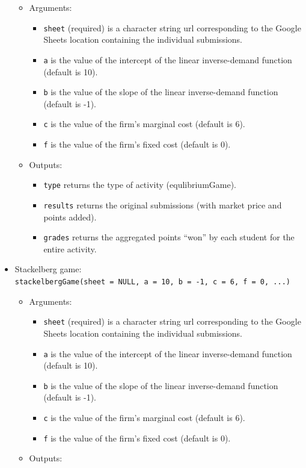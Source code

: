 \documentclass[
]{article}
\providecommand{\tightlist}{%
  \setlength{\itemsep}{0pt}\setlength{\parskip}{0pt}}
\begin{document}
\begin{itemize}
  \begin{itemize}
  \item
    Arguments:

    \begin{itemize}
    \tightlist
    \item
      \texttt{sheet} (required) is a character string url corresponding
      to the Google Sheets location containing the individual
      submissions.
    \item
      \texttt{a} is the value of the intercept of the linear
      inverse-demand function (default is 10).
    \item
      \texttt{b} is the value of the slope of the linear inverse-demand
      function (default is -1).
    \item
      \texttt{c} is the value of the firm's marginal cost (default is
      6).
    \item
      \texttt{f} is the value of the firm's fixed cost (default is 0).
    \end{itemize}
  \item
    Outputs:

    \begin{itemize}
    \tightlist
    \item
      \texttt{type} returns the type of activity (equlibriumGame).
    \item
      \texttt{results} returns the original submissions (with market
      price and points added).
    \item
      \texttt{grades} returns the aggregated points ``won'' by each
      student for the entire activity.
    \end{itemize}
  \end{itemize}
\item
  Stackelberg game:
  \texttt{stackelbergGame(sheet\ =\ NULL,\ a\ =\ 10,\ b\ =\ -1,\ c\ =\ 6,\ f\ =\ 0,\ ...)}

  \begin{itemize}
  \item
    Arguments:

    \begin{itemize}
    \tightlist
    \item
      \texttt{sheet} (required) is a character string url corresponding
      to the Google Sheets location containing the individual
      submissions.
    \item
      \texttt{a} is the value of the intercept of the linear
      inverse-demand function (default is 10).
    \item
      \texttt{b} is the value of the slope of the linear inverse-demand
      function (default is -1).
    \item
      \texttt{c} is the value of the firm's marginal cost (default is
      6).
    \item
      \texttt{f} is the value of the firm's fixed cost (default is 0).
    \end{itemize}
  \item
    Outputs:


\end{itemize}
\end{itemize}
\end{document}
